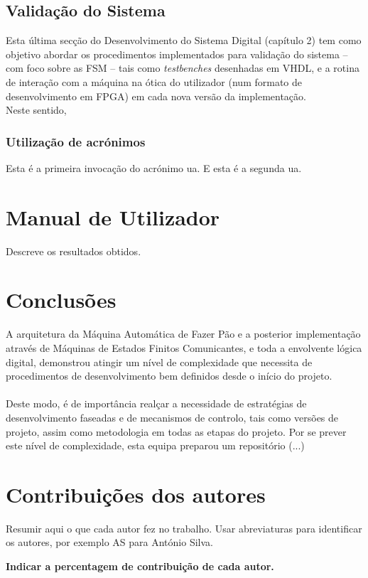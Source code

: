 \documentclass{report}
\begin{document}
\section{Validação do Sistema}
Esta última secção do Desenvolvimento do Sistema Digital (capítulo 2) tem como objetivo abordar os procedimentos implementados para validação do sistema -- com foco sobre as FSM -- tais como \textit{testbenches} desenhadas em VHDL, e a rotina de interação com a máquina na ótica do utilizador (num formato de desenvolvimento em FPGA) em cada nova versão da implementação.
\\
Neste sentido, 
\subsection{Utilização de acrónimos}
Esta é a primeira invocação do acrónimo \ac{ua}.
E esta é a segunda \ac{ua}.

\chapter{Manual de Utilizador}
\label{chap.manualUtilizador}
Descreve os resultados obtidos.

\chapter{Conclusões}
\label{chap.conclusao}
A arquitetura da Máquina Automática de Fazer Pão e a posterior implementação através de Máquinas de Estados Finitos Comunicantes, e toda a envolvente lógica digital, demonstrou atingir um nível de complexidade que necessita de procedimentos de desenvolvimento bem definidos desde o início do projeto.
\\\\
Deste modo, é de importância realçar a necessidade de estratégias de desenvolvimento faseadas e de mecanismos de controlo, tais como versões de projeto, assim como metodologia em todas as etapas do projeto. Por se prever este nível de complexidade, esta equipa preparou um repositório (...)



\chapter*{Contribuições dos autores}
Resumir aqui o que cada autor fez no trabalho.
Usar abreviaturas para identificar os autores,
por exemplo AS para António Silva.

\vspace{10pt}
\textbf{Indicar a percentagem de contribuição de cada autor.}\\
\end{document}
